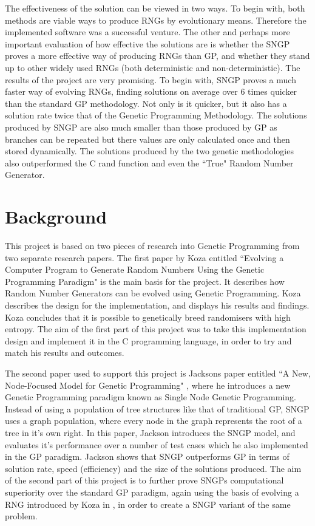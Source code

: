 \documentclass[a4paper,10.5pt]{article}
\begin{document}
The effectiveness of the solution can be viewed in two ways. To begin with, both methods are viable ways to produce RNGs by evolutionary means. Therefore the implemented software was a successful venture. The other and perhaps more important evaluation of how effective the solutions are is whether the SNGP proves a more effective way of producing RNGs than GP, and whether they stand up to other widely used RNGs (both deterministic and non-deterministic). The results of the project are very promising. To begin with, SNGP proves a much faster way of evolving RNGs, finding solutions on average over 6 times quicker than the standard GP methodology. Not only is it quicker, but it also has a solution rate twice that of the Genetic Programming Methodology. The solutions produced by SNGP are also much smaller than those produced by GP as branches can be repeated but there values are only calculated once and then stored dynamically. The solutions produced by the two genetic methodologies also outperformed the C rand function and even the ``True" Random Number Generator. 

\newpage
\section{Background}
This project is based on two pieces of research into Genetic Programming from two separate research papers. The first paper by Koza entitled ``Evolving a Computer Program to Generate Random Numbers Using the Genetic Programming Paradigm" is the main basis for the project. It describes how Random Number Generators can be evolved using Genetic Programming. Koza describes the design for the implementation, and displays his results and findings. Koza concludes that it is possible to genetically breed randomisers with high entropy. The aim of the first part of this project was to take this implementation design and implement it in the C programming language, in order to try and match his results and outcomes. 

The second paper used to support this project is Jacksons paper entitled ``A New, Node-Focused Model for Genetic Programming" \cite{jacksonsngp}, where he introduces a new Genetic Programming paradigm known as Single Node Genetic Programming. Instead of using a population of tree structures like that of traditional GP, SNGP uses a graph population, where every node in the graph represents the root of a tree in it's own right. In this paper, Jackson introduces the SNGP model, and evaluates it's performance over a number of test cases which he also implemented in the GP paradigm. Jackson shows that SNGP outperforms GP in terms of solution rate, speed (efficiency) and the size of the solutions produced. The aim of the second part of this project is to further prove SNGPs computational superiority over the standard GP paradigm, again using the basis of evolving a RNG introduced by Koza in \cite{kozarng}, in order to create a SNGP variant of the same problem.
\end{document}
